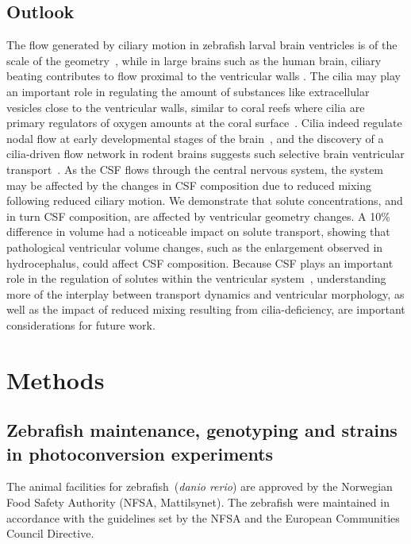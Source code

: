 \documentclass{WileyMSP-template}
\begin{document}
\subsection{Outlook}
The flow generated by ciliary motion
in zebrafish larval brain ventricles
is of the scale of the geometry~\cite{Olstad2019CiliaryDevelopment},
while in large brains such as the human brain, ciliary beating 
contributes to flow proximal to the ventricular walls
\cite{Siyahhan2014FlowVentricles}.
The cilia may play an important role in regulating the
amount of substances like extracellular vesicles close to the ventricular walls,
similar to coral reefs where cilia are primary regulators of
oxygen amounts at the coral surface~\cite{Pacherres2022CiliaryProduction}.
Cilia indeed regulate nodal flow at early
developmental stages of the brain~\cite{Hirokawa2006NodalAsymmetry},
and the discovery of a cilia-driven flow network
in rodent brains suggests such selective
brain ventricular transport~\cite{Faubel2016Cilia-basedVentricles}.
As the CSF flows through the central nervous system,
the system may be affected by the changes in CSF composition
due to reduced mixing following reduced
ciliary motion. We demonstrate that solute concentrations,
and in turn CSF composition, 
are affected by ventricular
geometry changes. A 10\% difference in volume
had a noticeable impact on solute transport,
showing that pathological ventricular volume changes,
such as the enlargement observed in hydrocephalus,
could affect CSF composition.
Because CSF plays an important role in the regulation of solutes
within the ventricular system~\cite{yamada2021cerebrospinal},
understanding more of the interplay between
transport dynamics and ventricular morphology,
as well as the impact of
reduced mixing resulting from cilia-deficiency,
are important considerations for future work.

\section{Methods}

\subsection{Zebrafish maintenance, genotyping and strains in photoconversion experiments}
The animal facilities for zebrafish~(\emph{danio rerio}) are approved by the
Norwegian Food Safety Authority (NFSA, Mattilsynet).
The zebrafish were maintained in accordance with the guidelines set by the
NFSA and the European Communities Council Directive.
\end{document}
